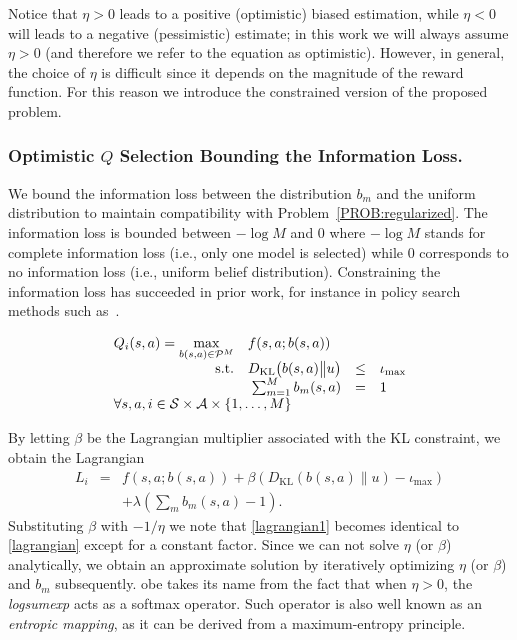 Notice that $\eta>0$ leads to a positive (optimistic) biased estimation, while $\eta<0$ will leads to a negative (pessimistic) estimate; in this work we will always assume $\eta>0$ (and therefore we refer to the equation as optimistic). 
However, in general, the choice of $\eta$ is difficult since it depends on the magnitude of the reward function. For this reason we introduce the constrained version of the proposed problem.
 
\subsubsection{Optimistic $Q$ Selection Bounding the Information Loss.}
We bound the information loss between the distribution $b_m$ and the uniform distribution to maintain compatibility with Problem~\ref{PROB:regularized}. The information loss is bounded between $-\log M$ and $0$ where  $-\log M$ stands for complete information loss (i.e., only one model is selected) while $0$ corresponds to no information loss (i.e., uniform belief distribution). Constraining the information loss has succeeded in prior work, for instance in policy search methods such as~\cite{peters2010relative}.
\begin{probdef}
\begin{equation}
\begin{array}{rrclcl}
\displaystyle Q_i(s,a) = \max_{b(s,a) \in \mathcal{P}^M} & \multicolumn{3}{l}{f(s,a;b(s,a))\nonumber } \\
\text{s.t.} & D_{\mathrm{KL}}\big(b(s,a)\big{\|} u \big)& \leq & \iota_{\max} \\
& \sum_{m=1}^{M} b_m(s,a) & = & 1 \\
\multicolumn{4}{l}{ \forall s,a,i \in \mathcal{S} \times \mathcal{A} \times \{1,\dots,M\}}
\end{array} \nonumber
\end{equation}\label{PROB:constrversion}
\end{probdef}
\noindent By letting $\beta$ be the Lagrangian multiplier associated with the KL constraint, we obtain the Lagrangian
\begin{eqnarray}
L_i &\! = \!& f(s,a;b(s,a)) + \beta (D_{\mathrm{KL}}(b(s,a){\|}u) - \iota_{\max}) \nonumber \\
& &   + \lambda(\sum_m b_m(s,a) - 1).
\end{eqnarray}\label{lagrangian1}
Substituting $\beta$ with $-1/\eta$ we note that \eqref{lagrangian1} becomes identical to \eqref{lagrangian} except for a constant factor. Since we can not solve $\eta$ (or $\beta$) analytically, we obtain an approximate solution by iteratively optimizing $\eta$ (or $\beta$) and $b_m$ subsequently.
\gls{obe} takes its name from the fact that when $\eta > 0$, the \textit{logsumexp} acts as a softmax operator. Such operator is also well known as an \textit{entropic mapping}, as it can be derived from a maximum-entropy principle.

